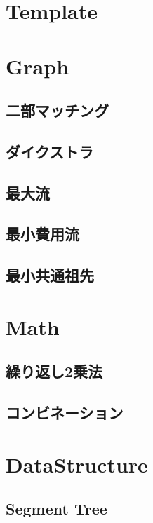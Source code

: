 \documentclass[titlepage, landscape, a4paper, 12pt, twocolumn]{jsarticle}
\begin{document}
\section{Template}


\section{Graph}
\subsection{二部マッチング}

\subsection{ダイクストラ}

\subsection{最大流}

\subsection{最小費用流}

\subsection{最小共通祖先}


\section{Math}
\subsection{繰り返し2乗法}

\subsection{コンビネーション}


\section{DataStructure}
\subsection{Segment Tree}

\end{document}
